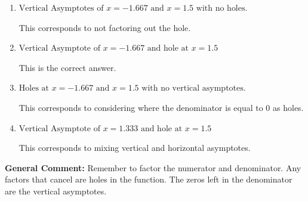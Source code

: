 \documentclass{extbook}[14pt]
\begin{document}
\begin{enumerate}
{\begin{enumerate}[label=\Alph*.]
This corresponds to setting the numerator equal to 0.
\item \( \text{Vertical Asymptotes of } x = -1.667 \text{ and } x = 1.5 \text{ with no holes.} \)

This corresponds to not factoring out the hole.
\item \( \text{Vertical Asymptote of } x = -1.667 \text{ and hole at } x = 1.5 \)

This is the correct answer.
\item \( \text{Holes at } x = -1.667 \text{ and } x = 1.5 \text{ with no vertical asymptotes.} \)

This corresponds to considering where the denominator is equal to 0 as holes.
\item \( \text{Vertical Asymptote of } x = 1.333 \text{ and hole at } x = 1.5 \)

This corresponds to mixing vertical and horizontal asymptotes.
\end{enumerate}

\textbf{General Comment:} Remember to factor the numerator and denominator. Any factors that cancel are holes in the function. The zeros left in the denominator are the vertical asymptotes.
}
\end{enumerate}
\end{document}
